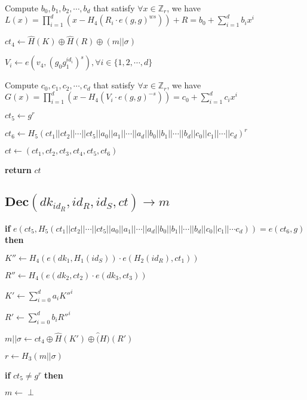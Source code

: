 \documentclass[a4paper]{article}
\begin{document}
Compute $b_0, b_1, b_2, \cdots, b_d$ that satisfy $\forall x \in \mathbb{Z}_r$, we have $L(x) = \prod\limits_{i = 1}^d (x - H_4(R_i \cdot e(g, g)^{ws})) + R = b_0 + \sum\limits_{i = 1}^d b_i x^i$

$\textit{ct}_4 \gets \hat{H}(K) \oplus \hat{H}(R) \oplus (m || \sigma)$

$V_i \gets e(v_4, (g_0 g_1^{\textit{id}_i})^s), \forall i \in \{1, 2, \cdots, d\}$

Compute $c_0, c_1, c_2, \cdots, c_d$ that satisfy $\forall x \in \mathbb{Z}_r$, we have $G(x) = \prod\limits_{i = 1}^d (x - H_4(V_i \cdot e(g, g)^{-s})) = c_0 + \sum\limits_{i = 1}^d c_i x^i$

$\textit{ct}_5 \gets g^r$

$\textit{ct}_6 \gets H_5(\textit{ct}_1 || \textit{ct}_2 || \cdots || \textit{ct}_5 || a_0 || a_1 || \cdots || a_d || b_0 || b_1 || \cdots || b_d || c_0 || c_1 || \cdots || c_d)^r$

$\textit{ct} \gets (\textit{ct}_1, \textit{ct}_2, \textit{ct}_3, \textit{ct}_4, \textit{ct}_5, \textit{ct}_6)$

\textbf{return} $\textit{ct}$

\subsection{$\textbf{Dec}(\textit{dk}_{\textit{id}_R}, \textit{id}_R, \textit{id}_S, \textit{ct}) \rightarrow m$}

\textbf{if} $e(\textit{ct}_5, H_5(\textit{ct}_1 || \textit{ct}_2 || \cdots || \textit{ct}_5 || a_0 || a_1 || \cdots || a_d || b_0 || b_1 || \cdots || b_d || c_0 || c_1 || \cdots c_d)) = e(\textit{ct}_6, g)$ \textbf{then}

	\quad$K'' \gets H_4(e(\textit{dk}_1, H_1(\textit{id}_S)) \cdot e(H_2(\textit{id}_R), \textit{ct}_1))$

	\quad$R'' \gets H_4(e(\textit{dk}_2, \textit{ct}_2) \cdot e(\textit{dk}_3, \textit{ct}_3))$

	\quad$K' \gets \sum\limits_{i = 0}^d a_i K''^i$

	\quad$R' \gets \sum\limits_{i = 0}^d b_i R''^i$

	\quad$m || \sigma \gets \textit{ct}_4 \oplus \hat{H}(K') \oplus \hat(H)(R')$

	\quad$r \gets H_3(m || \sigma)$

	\quad\textbf{if} $\textit{ct}_5 \neq g^r$ \textbf{then}

		\quad\quad$m \gets \perp$
\end{document}
